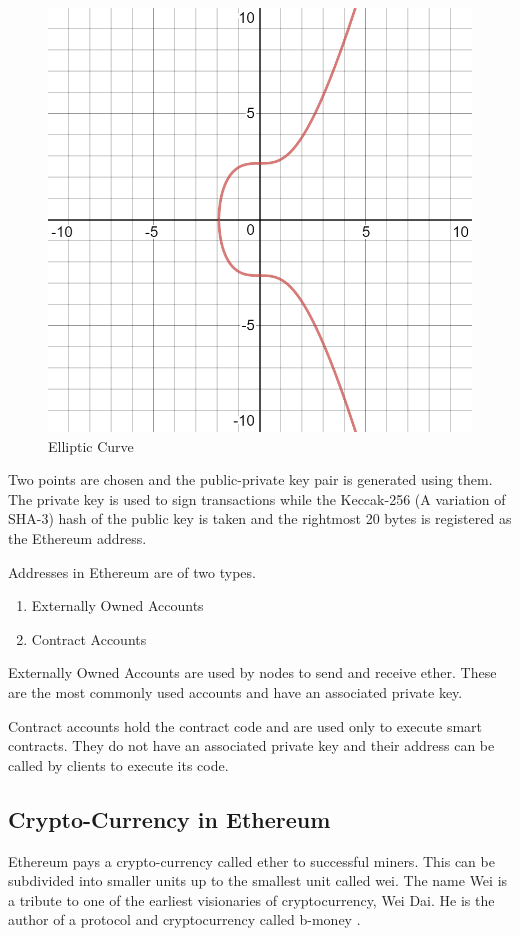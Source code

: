 \documentclass[11pt,openright]{report}
\begin{document}
\begin{figure}
	\centering
	\includegraphics[scale=0.5]{images/ecc.png}
	\caption{Elliptic Curve}
	\label{fig:elliptic_curve}
\end{figure}

Two points are chosen and the public-private key pair is generated using them. The private key is used to sign transactions while the Keccak-256 (A variation of SHA-3) hash of the public key is taken and the rightmost 20 bytes is registered as the Ethereum address.

Addresses in Ethereum are of two types.
\begin{enumerate}
    \item Externally Owned Accounts
    \item Contract Accounts
\end{enumerate}

Externally Owned Accounts are used by nodes to send and receive ether. These are the most commonly used accounts and have an associated private key.

Contract accounts hold the contract code and are used only to execute smart contracts. They do not have an associated private key and their address can be called by clients to execute its code.


\subsection{Crypto-Currency in Ethereum}
Ethereum pays a crypto-currency called ether to successful miners. This can be subdivided into smaller units up to the smallest unit called wei. The name Wei is a tribute to one of the earliest visionaries of cryptocurrency, Wei Dai. He is the author of a protocol and cryptocurrency called b-money \cite{dai1998bmoney}.
\end{document}
